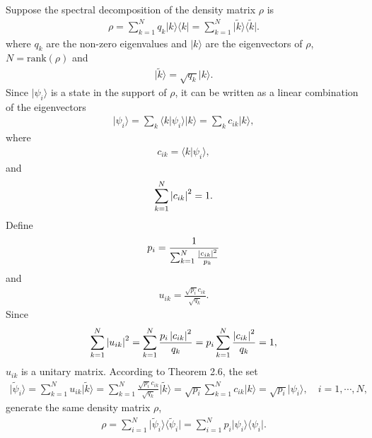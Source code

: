 \documentclass[en]{sol-man}
\begin{document}
\begin{pf}
    Suppose the spectral decomposition of the density matrix $\rho$ is
    \begin{align}
        \rho=\sum_{k=1}^Nq_k\lvert k\rangle\langle k\rvert=\sum_{k=1}^N\lvert\tilde{k}\rangle\langle\tilde{k}\rvert.
    \end{align}
    where $q_k$ are the non-zero eigenvalues and $\lvert k\rangle$ are the eigenvectors of $\rho$, $N=\text{rank}(\rho)$ and
    \begin{align}
        \lvert\tilde{k}\rangle=\sqrt{q_k}\lvert k\rangle.
    \end{align}
    Since $\lvert\psi_i\rangle$ is a state in the support of $\rho$, it can be written as a linear combination of the eigenvectors
    \begin{align}
        \lvert\psi_i\rangle=\sum_k\langle k\vert\psi_i\rangle\lvert k\rangle=\sum_kc_{ik}\lvert k\rangle,
    \end{align}
    where
    \begin{align}
        c_{ik}=\langle k\vert\psi_i\rangle,
    \end{align}
    and
    \begin{align}
        \sum_{k=1}^N\left\lvert c_{ik}\right\rvert^2=1.
    \end{align}
    Define
    \begin{align}
        p_i=\frac{1}{\sum_{k=1}^N\frac{\left\lvert c_{ik}\right\rvert^2}{p_k}}
    \end{align}
    and
    \begin{align}
        u_{ik}=\frac{\sqrt{p_i}c_{ik}}{\sqrt{q_k}}.
    \end{align}
    Since
    \begin{align}
        \sum_{k=1}^N\left\lvert u_{ik}\right\rvert^2=\sum_{k=1}^N\frac{p_i\left\lvert c_{ik}\right\rvert^2}{q_k}=p_i\sum_{k=1}^N\frac{\left\lvert c_{ik}\right\rvert^2}{q_k}=1,
    \end{align}
    $u_{ik}$ is a unitary matrix.
    According to Theorem 2.6, the set
    \begin{align}
        \lvert\tilde{\psi}_i\rangle=\sum_{k=1}^Nu_{ik}\lvert\tilde{k}\rangle=\sum_{k=1}^N\frac{\sqrt{p_i}c_{ik}}{\sqrt{q_k}}\lvert\tilde{k}\rangle=\sqrt{p_i}\sum_{k=1}^Nc_{ik}\lvert k\rangle=\sqrt{p_i}\lvert\psi_i\rangle,\quad i=1,\cdots,N,
    \end{align}
    generate the same density matrix $\rho$,
    \begin{align}
        \rho=\sum_{i=1}^N\lvert\tilde{\psi}_i\rangle\langle\tilde{\psi}_i\rvert=\sum_{i=1}^Np_i\lvert\psi_i\rangle\langle\psi_i\rvert.

\end{align}
\end{pf}
\end{document}

